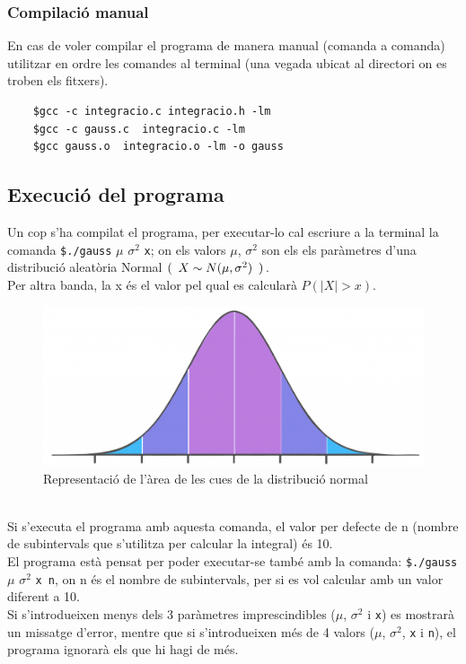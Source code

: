 \documentclass[12pt]{article}
\begin{document}
\subsubsection{Compilació manual}
En cas de voler compilar el programa de manera manual (comanda a comanda) utilitzar en ordre les comandes al terminal (una vegada ubicat al directori on es troben els fitxers).
\begin{verbatim}
    $gcc -c integracio.c integracio.h -lm
    $gcc -c gauss.c  integracio.c -lm 
    $gcc gauss.o  integracio.o -lm -o gauss
\end{verbatim}

\subsection{Execució del programa}\label{execucio}
Un cop s'ha compilat el programa, per executar-lo cal escriure a la terminal la comanda \texttt{\$./gauss} $ \mu$ $\sigma^2$ \texttt{x}; on els valors $\mu$, $\sigma^2$ son els els paràmetres d'una distribució aleatòria Normal $(\hspace{0.5em}X \sim N(\mu,\sigma^2)\hspace{0.5em})$.\\
Per altra banda, la x és el valor pel qual es calcularà $P(|X|>x)$.\\
\begin{figure}[h]
    \centering
    \includegraphics[width = 0.75 \textwidth]{normalcuquibuena.PNG}
    \caption{Representació de l'àrea de les cues de la distribució normal}
    \label{fig:my_label}
\end{figure}\\
Si s'executa el programa amb aquesta comanda, el valor per defecte de n (nombre de subintervals que s'utilitza per calcular la integral) és 10. \\
El programa està pensat per poder executar-se també amb la comanda: \texttt{\$./gauss} $ \mu$ $\sigma^2$ \texttt{x n}, on n és el nombre de subintervals, per si es vol calcular amb un valor diferent a 10.\\
Si s'introdueixen menys dels 3 paràmetres imprescindibles ($\mu$, $\sigma^2$ i \texttt{x}) es mostrarà un missatge d'error, mentre que si s'introdueixen més de 4 valors ($\mu$, $\sigma^2$, \texttt{x} i \texttt{n}), el programa ignorarà els que hi hagi de més.\\
\end{document}
